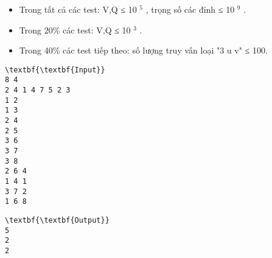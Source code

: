 \begin{itemize}
	\item Trong tất cả các test: V,Q ≤ 10 $^ 5 $ , trọng số các đỉnh ≤ 10 $^ 9 $ .
	\item Trong 20\% các test: V,Q ≤ 10 $^ 3 $ .
	\item Trong 40\% các test tiếp theo: số lượng truy vấn loại "3 u v" ≤ 100.
\end{itemize}
\begin{verbatim}
\textbf{\textbf{Input}}
8 4
2 4 1 4 7 5 2 3
1 2
1 3
2 4
2 5
3 6
3 7
3 8
2 6 4
1 4 1
3 7 2
1 6 8
\end{verbatim}
\begin{verbatim}
\textbf{\textbf{Output}}
5
2
2\end{verbatim}